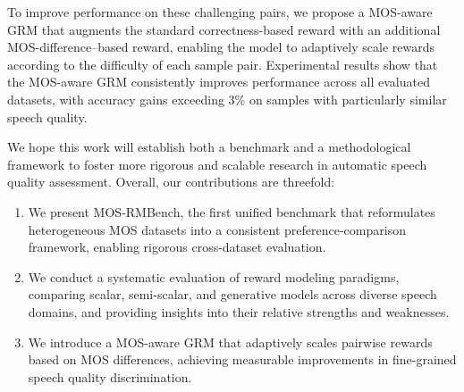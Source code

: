 To improve performance on these challenging pairs, we propose a MOS-aware GRM that augments the standard correctness-based reward with an additional MOS-difference–based reward, enabling the model to adaptively scale rewards according to the difficulty of each sample pair. Experimental results show that the MOS-aware GRM consistently improves performance across all evaluated datasets, with accuracy gains exceeding 3\% on samples with particularly similar speech quality.

We hope this work will establish both a benchmark and a methodological framework to foster more rigorous and scalable research in automatic speech quality assessment. Overall, our contributions are threefold:
\begin{enumerate}
\setlength\parskip{0em}
    \item We present MOS-RMBench, the first unified benchmark that reformulates heterogeneous MOS datasets into a consistent preference-comparison framework, enabling rigorous cross-dataset evaluation.
    \item We conduct a systematic evaluation of reward modeling paradigms, comparing scalar, semi-scalar, and generative models across diverse speech domains, and providing insights into their relative strengths and weaknesses.
    \item We introduce a MOS-aware GRM that adaptively scales pairwise rewards based on MOS differences, achieving measurable improvements in fine-grained speech quality discrimination.
\end{enumerate}